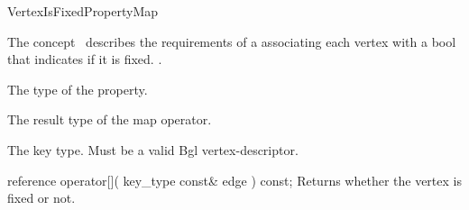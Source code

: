 
\begin{ccRefConcept}{VertexIsFixedPropertyMap}


\ccDefinition

The concept \ccRefName\ describes the requirements of a
associating each vertex with a bool that indicates if it is fixed.
.

\ccRefines
  
\ccTypes
  
    {The type of the property.}
    
    {The result type of the map operator.}

  {The key type. Must be a valid {\sc Bgl} vertex-descriptor.}

\ccCreation
{}  %

\ccOperations

\ccMethod
  {reference operator[]( key_type const& edge ) const;}
  {Returns whether the vertex is fixed or not.}  


\ccHasModels
{}\\
\\

\end{ccRefConcept}



